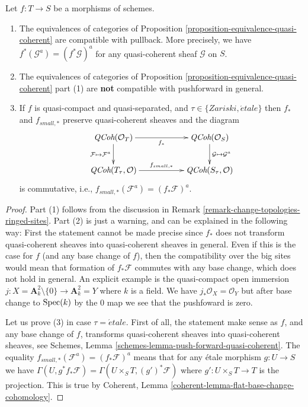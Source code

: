 \begin{proposition}
\label{proposition-equivalence-quasi-coherent-functorial}
Let $f : T \to S$ be a morphisms of schemes.
\begin{enumerate}
\item The equivalences of categories of
Proposition \ref{proposition-equivalence-quasi-coherent}
are compatible with pullback.
More precisely, we have $f^*(\mathcal{G}^a) = (f^*\mathcal{G})^a$
for any quasi-coherent sheaf $\mathcal{G}$ on $S$.
\item The equivalences of categories of
Proposition \ref{proposition-equivalence-quasi-coherent} part (1)
are {\bf not} compatible with pushforward in general.
\item If $f$ is quasi-compact and quasi-separated, and
$\tau \in \{Zariski, \acute{e}tale\}$ then $f_*$ and $f_{small, *}$
preserve quasi-coherent sheaves and the diagram
$$
\xymatrix{
\textit{QCoh}(\mathcal{O}_T)
\ar[rr]_{f_*} \ar[d]_{\mathcal{F} \mapsto \mathcal{F}^a} & &
\textit{QCoh}(\mathcal{O}_S)
\ar[d]^{\mathcal{G} \mapsto \mathcal{G}^a} \\
\textit{QCoh}(T_\tau, \mathcal{O}) \ar[rr]^{f_{small, *}} & &
\textit{QCoh}(S_\tau, \mathcal{O})
}
$$
is commutative, i.e., $f_{small, *}(\mathcal{F}^a) = (f_*\mathcal{F})^a$.
\end{enumerate}
\end{proposition}

\begin{proof}
Part (1) follows from the discussion in
Remark \ref{remark-change-topologies-ringed-sites}.
Part (2) is just a warning, and can be explained in the following way:
First the statement cannot be made precise since $f_*$ does not
transform quasi-coherent sheaves into quasi-coherent sheaves in general.
Even if this is the case for $f$ (and any base change of $f$), then the
compatibility over the big sites would mean that formation of $f_*\mathcal{F}$
commutes with any base change, which does not hold in general.
An explicit example is the quasi-compact open immersion
$j : X = \mathbf{A}^2_k \setminus \{0\} \to \mathbf{A}^2_k = Y$
where $k$ is a field. We have $j_*\mathcal{O}_X = \mathcal{O}_Y$
but after base change to $\mathop{\rm Spec}(k)$ by the $0$ map
we see that the pushfoward is zero.

\medskip\noindent
Let us prove (3) in case $\tau = \acute{e}tale$. First of all, the statement
make sense as $f$, and any base change of $f$, transforms quasi-coherent sheaves
into quasi-coherent sheaves, see
Schemes, Lemma \ref{schemes-lemma-push-forward-quasi-coherent}.
The equality $f_{small, *}(\mathcal{F}^a) = (f_*\mathcal{F})^a$
means that for any \'etale morphism $g : U \to S$ we have
$\Gamma(U, g^*f_*\mathcal{F}) = \Gamma(U \times_S T, (g')^*\mathcal{F})$
where $g' : U \times_S T \to T$ is the projection. This is true by
Coherent, Lemma \ref{coherent-lemma-flat-base-change-cohomology}.
\end{proof}


